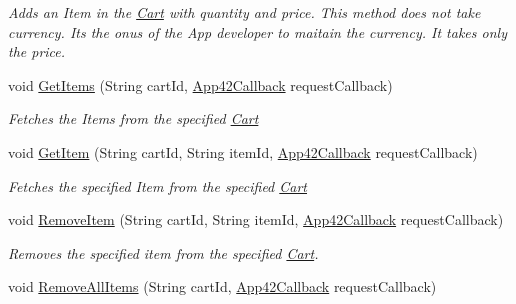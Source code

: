\begin{DoxyCompactItemize}
\begin{DoxyCompactList}\small\item\em Adds an Item in the \hyperlink{classcom_1_1shephertz_1_1app42_1_1paas_1_1sdk_1_1windows_1_1shopping_1_1_cart}{Cart} with quantity and price. This method does not take currency. Its the onus of the App developer to maitain the currency. It takes only the price. \end{DoxyCompactList}\item 
void \hyperlink{classcom_1_1shephertz_1_1app42_1_1paas_1_1sdk_1_1windows_1_1shopping_1_1_cart_service_ae9dbe4410791e6566e48d1eced521551}{Get\+Items} (String cart\+Id, \hyperlink{interfacecom_1_1shephertz_1_1app42_1_1paas_1_1sdk_1_1windows_1_1_app42_callback}{App42\+Callback} request\+Callback)
\begin{DoxyCompactList}\small\item\em Fetches the Items from the specified \hyperlink{classcom_1_1shephertz_1_1app42_1_1paas_1_1sdk_1_1windows_1_1shopping_1_1_cart}{Cart} \end{DoxyCompactList}\item 
void \hyperlink{classcom_1_1shephertz_1_1app42_1_1paas_1_1sdk_1_1windows_1_1shopping_1_1_cart_service_a2c7fb85b8fea368b3d981c62c79e87b9}{Get\+Item} (String cart\+Id, String item\+Id, \hyperlink{interfacecom_1_1shephertz_1_1app42_1_1paas_1_1sdk_1_1windows_1_1_app42_callback}{App42\+Callback} request\+Callback)
\begin{DoxyCompactList}\small\item\em Fetches the specified Item from the specified \hyperlink{classcom_1_1shephertz_1_1app42_1_1paas_1_1sdk_1_1windows_1_1shopping_1_1_cart}{Cart} \end{DoxyCompactList}\item 
void \hyperlink{classcom_1_1shephertz_1_1app42_1_1paas_1_1sdk_1_1windows_1_1shopping_1_1_cart_service_a55f719164162ba2f2cfad195dade37a4}{Remove\+Item} (String cart\+Id, String item\+Id, \hyperlink{interfacecom_1_1shephertz_1_1app42_1_1paas_1_1sdk_1_1windows_1_1_app42_callback}{App42\+Callback} request\+Callback)
\begin{DoxyCompactList}\small\item\em Removes the specified item from the specified \hyperlink{classcom_1_1shephertz_1_1app42_1_1paas_1_1sdk_1_1windows_1_1shopping_1_1_cart}{Cart}. \end{DoxyCompactList}\item 
void \hyperlink{classcom_1_1shephertz_1_1app42_1_1paas_1_1sdk_1_1windows_1_1shopping_1_1_cart_service_adbc5ef6a79d143013ffd0097823e680e}{Remove\+All\+Items} (String cart\+Id, \hyperlink{interfacecom_1_1shephertz_1_1app42_1_1paas_1_1sdk_1_1windows_1_1_app42_callback}{App42\+Callback} request\+Callback)

\end{DoxyCompactItemize}

